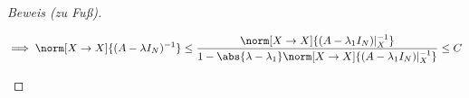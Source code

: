 \begin{proof}[Beweis (zu Fuß)]
\begin{enumerate}[label = (\roman*)]
        \begin{align*}
            \implies
            \norm[X \to X]{(A - \lambda I_N)^{-1}}
            \leq
            \frac
            {
                \norm[X \to X]{(A - \lambda_1 I_N) |_X^{-1}}
            }{
                1
                -
                \abs{\lambda - \lambda_1}
                \norm[X \to X]{(A - \lambda_1 I_N) |_X^{-1}}
            }
            \leq
            C
        \end{align*}

    \end{enumerate}

\end{proof}
